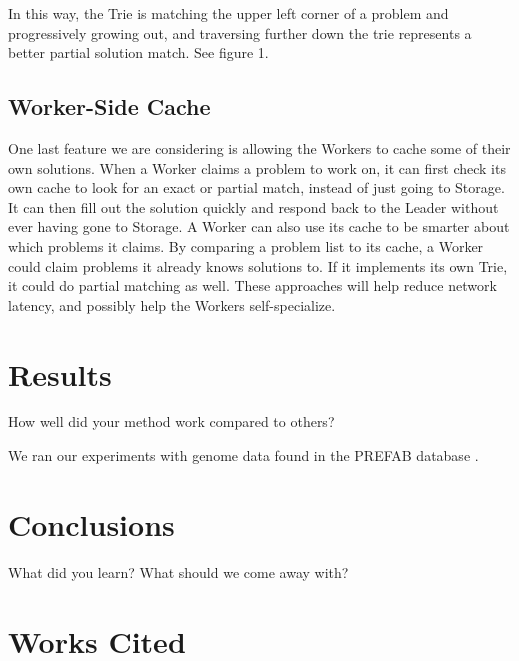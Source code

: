 \documentclass[11pt]{article}
\begin{document}
In this way, the Trie is matching the upper left corner of a problem and progressively growing out, and traversing further down the trie represents a better partial solution match. See figure 1.




\subsection{Worker-Side Cache}

One last feature we are considering is allowing the Workers to cache some of their own solutions. When a Worker claims a problem to work on, it can first check its own cache to look for an exact or partial match, instead of just going to Storage. It can then fill out the solution quickly and respond back to the Leader without ever having gone to Storage. A Worker can also use its cache to be smarter about which problems it claims. By comparing a problem list to its cache, a Worker could claim problems it already knows solutions to. If it implements its own Trie, it could do partial matching as well.
These approaches will help reduce network latency, and possibly help the Workers self-specialize.


\section{Results}

How well did your method work compared to others?

We ran our experiments with genome data found in the PREFAB database \cite{Edgar:04}.


\section{Conclusions} 

What did you learn? What should we come away with?


\section{Works Cited}
\end{document}
